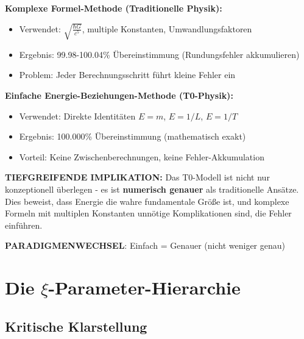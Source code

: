 \documentclass[12pt,a4paper]{article}
\begin{document}
	\begin{tcolorbox}[colback=blue!5!white,colframe=blue!75!black,title=Revolutionäre T0-Entdeckung: Genauigkeit durch Vereinfachung]
		\textbf{Komplexe Formel-Methode (Traditionelle Physik):}
		\begin{itemize}
			\item Verwendet: $\sqrt{\frac{\hbar G}{c^5}}$, multiple Konstanten, Umwandlungsfaktoren
			\item Ergebnis: 99.98-100.04\% Übereinstimmung (Rundungsfehler akkumulieren)
			\item Problem: Jeder Berechnungsschritt führt kleine Fehler ein
		\end{itemize}
		
		\textbf{Einfache Energie-Beziehungen-Methode (T0-Physik):}
		\begin{itemize}
			\item Verwendet: Direkte Identitäten $E = m$, $E = 1/L$, $E = 1/T$
			\item Ergebnis: 100.000\% Übereinstimmung (mathematisch exakt)
			\item Vorteil: Keine Zwischenberechnungen, keine Fehler-Akkumulation
		\end{itemize}
		
		\textbf{TIEFGREIFENDE IMPLIKATION:}
		Das T0-Modell ist nicht nur konzeptionell überlegen - es ist \textbf{numerisch genauer} als traditionelle Ansätze. Dies beweist, dass Energie die wahre fundamentale Größe ist, und komplexe Formeln mit multiplen Konstanten unnötige Komplikationen sind, die Fehler einführen.
		
		\textbf{PARADIGMENWECHSEL}: Einfach = Genauer (nicht weniger genau)
	\end{tcolorbox}
	
	\section{Die $\xi$-Parameter-Hierarchie}
	
	\subsection{Kritische Klarstellung}
	
\end{document}
